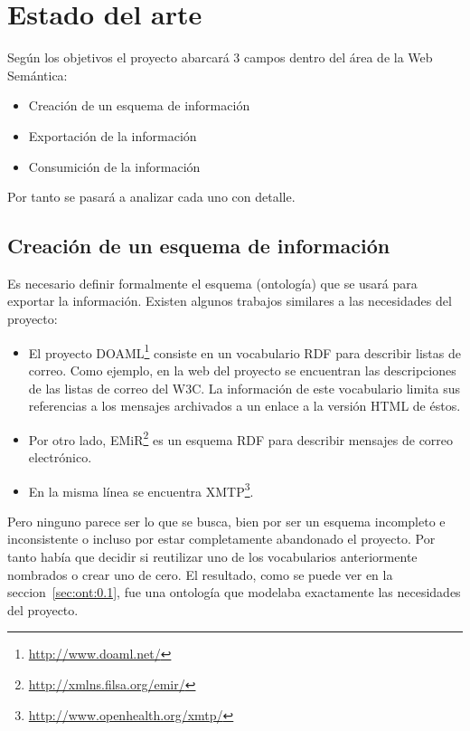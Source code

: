 
\section{Estado del arte}

Según los objetivos el proyecto abarcará 3 campos dentro del área de la
Web Semántica:

\begin{itemize}
 \item Creación de un esquema de información
 \item Exportación de la información
 \item Consumición de la información
\end{itemize}

Por tanto se pasará a analizar cada uno con detalle.

\subsection{Creación de un esquema de información}

Es necesario definir formalmente el esquema (ontología) que se usará para
exportar la información. Existen algunos trabajos similares a las necesidades 
del proyecto:

\begin{itemize}
  \item El proyecto DOAML\footnote{\url{http://www.doaml.net/}} consiste en un 
	vocabulario RDF para describir listas de correo. Como ejemplo, en 
	la web del proyecto se encuentran las descripciones de las listas 
	de correo del W3C. La información de este vocabulario limita sus 
	referencias a los mensajes archivados a un enlace a la versión HTML 
	de éstos.
  \item Por otro lado, EMiR\footnote{\url{http://xmlns.filsa.org/emir/}} es un 
	esquema RDF para describir mensajes de correo electrónico. 
  \item En la misma línea se encuentra XMTP\footnote{\url{http://www.openhealth.org/xmtp/}}.
\end{itemize}

Pero ninguno parece ser lo que se busca, bien por ser un esquema incompleto e
inconsistente o incluso por estar completamente abandonado el proyecto. Por 
tanto había que decidir si reutilizar uno de los vocabularios anteriormente
nombrados o crear uno de cero. El resultado, como se puede ver en la
seccion~\ref{sec:ont:0.1}, fue una ontología que modelaba exactamente las
necesidades del proyecto.

